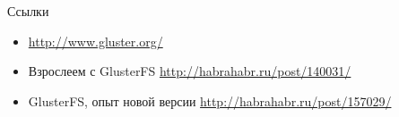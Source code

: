 \documentclass{beamer}
\begin{document}
\begin{frame}{Ссылки}
	\begin{itemize}
		\item \url{http://www.gluster.org/}
		\item Взрослеем с GlusterFS \url{http://habrahabr.ru/post/140031/}
		\item GlusterFS, опыт новой версии \url{http://habrahabr.ru/post/157029/}
	\end{itemize}
\end{frame}
\end{document}
